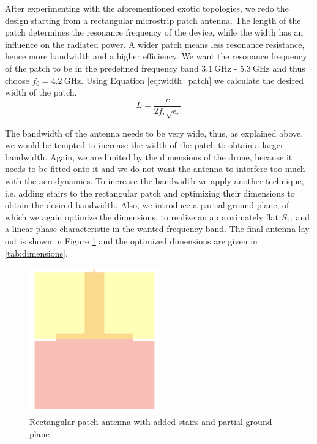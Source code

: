 \documentclass[a4paper]{article}        %
\begin{document}
	After experimenting with the aforementioned exotic topologies, we redo the design starting from a rectangular microstrip patch antenna. The length of the patch determines the resonance frequency of the device, while the width has an influence on the radiated power. A wider patch means less resonance resistance, hence more bandwidth and a higher efficiency. 
	We want the resonance frequency of the patch to be in the predefined frequency band $\SI{3.1}{\giga\hertz}$ - $\SI{5.3}{\giga\hertz}$ and thus choose $f_0 = \SI{4.2}{\giga\hertz}$. Using Equation \eqref{eq:width_patch} we calculate the desired width of the patch.
	\begin{equation} 
	L = \frac{c}{2 f_r \sqrt{\epsilon_r}}
	\label{eq:width_patch}
	\end{equation}

  The bandwidth of the antenna needs to be very wide, thus, as explained above, we would be tempted to increase the width of the patch to obtain a larger bandwidth. Again, we are limited by the dimensions of the drone, because it needs to be fitted onto it and we do not want the antenna to interfere too much with the aerodynamics. To increase the bandwidth we apply another technique, i.e. adding stairs to the rectangular patch and optimizing their dimensions to obtain the desired bandwidth. Also, we introduce a partial ground plane, of which we again optimize the dimensions, to realize an approximately flat $S_{11}$ and a linear phase characteristic in the wanted frequency band. The final antenna lay-out is shown in Figure \ref{fig:patch_stairs} and the optimized dimensions are given in \autoref{tab:dimensions}.

	\begin{figure}[H]
	\centering
		\includegraphics[width=0.5\textwidth]{images/antenna/patch_stairs.png}
		\caption{Rectangular patch antenna with added stairs and partial ground plane}
		\label{fig:patch_stairs}
	\end{figure}
\end{document}
